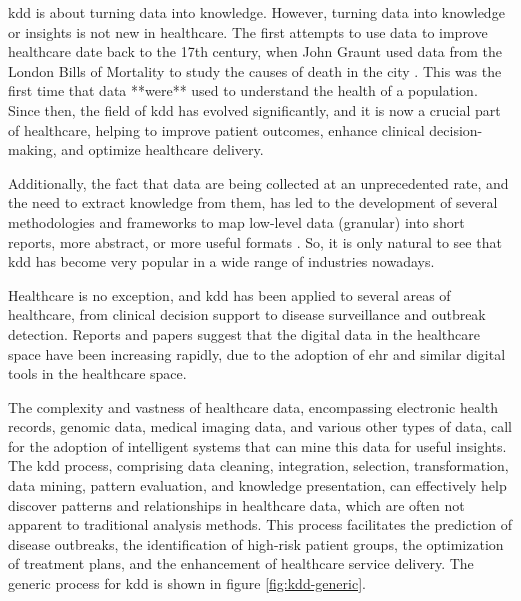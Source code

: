 
\ac{kdd} is about turning data into knowledge. However, turning data into knowledge or insights is not new in healthcare. The first attempts to use data to improve healthcare date back to the 17th century, when John Graunt used data from the London Bills of Mortality to study the causes of death in the city \cite{741e4dcd-5d3c-325c-9241-5eb5ddd0cb60}. This was the first time that data **were** used to understand the health of a population. Since then, the field of \ac{kdd} has evolved significantly, and it is now a crucial part of healthcare, helping to improve patient outcomes, enhance clinical decision-making, and optimize healthcare delivery.

Additionally, the fact that data are being collected at an unprecedented rate, and the need to extract knowledge from them, has led to the development of several methodologies and frameworks to map low-level data (granular) into short reports, more abstract, or more useful formats \cite{Fayyad_Piatetsky-Shapiro_Smyth_1996}. So, it is only natural to see that \ac{kdd} has become very popular in a wide range of industries nowadays.

Healthcare is no exception, and \ac{kdd} has been applied to several areas of healthcare, from clinical decision support to disease surveillance and outbreak detection. Reports and papers suggest that \cite{dashBigDataHealthcare2019} the digital data in the healthcare space have been increasing rapidly, due to the adoption of \ac{ehr} and similar digital tools in the healthcare space. 

The complexity and vastness of healthcare data, encompassing electronic health records, genomic data, medical imaging data, and various other types of data, call for the adoption of intelligent systems that can mine this data for useful insights. The \ac{kdd} process, comprising data cleaning, integration, selection, transformation, data mining, pattern evaluation, and knowledge presentation, can effectively help discover patterns and relationships in healthcare data, which are often not apparent to traditional analysis methods. This process facilitates the prediction of disease outbreaks, the identification of high-risk patient groups, the optimization of treatment plans, and the enhancement of healthcare service delivery. The generic process for \ac{kdd} is shown in figure \ref{fig:kdd-generic}.

